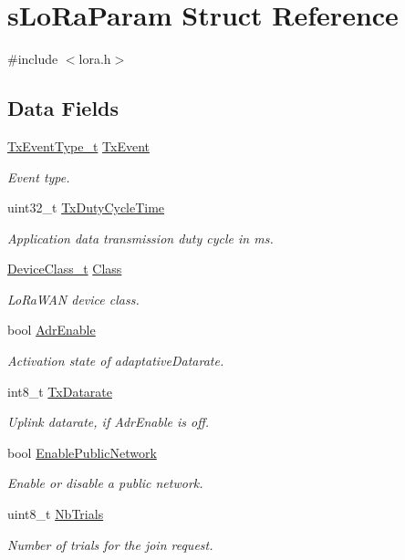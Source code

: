 \hypertarget{structsLoRaParam}{}\section{s\+Lo\+Ra\+Param Struct Reference}
\label{structsLoRaParam}


{\ttfamily \#include $<$lora.\+h$>$}

\subsection*{Data Fields}
\begin{DoxyCompactItemize}
\item 
\hyperlink{lora_8h_ad214b606ffdf2be60abb61bcebbbc83e}{Tx\+Event\+Type\+\_\+t} \hyperlink{structsLoRaParam_ac51a8bbd4a6e35431b1f232f4e2689b1}{Tx\+Event}
\begin{DoxyCompactList}\small\item\em Event type. \end{DoxyCompactList}\item 
uint32\+\_\+t \hyperlink{structsLoRaParam_a0a319805932b2ad94707c26eaa38da23}{Tx\+Duty\+Cycle\+Time}
\begin{DoxyCompactList}\small\item\em Application data transmission duty cycle in ms. \end{DoxyCompactList}\item 
\hyperlink{group__LORAMAC_ga29dc2e097802faaf8fbd0e18ff99695f}{Device\+Class\+\_\+t} \hyperlink{structsLoRaParam_a3c241a0817ffb57f327d8ae3460befbb}{Class}
\begin{DoxyCompactList}\small\item\em Lo\+Ra\+W\+AN device class. \end{DoxyCompactList}\item 
bool \hyperlink{structsLoRaParam_aa6b992022ef325e70e97b10a7356381e}{Adr\+Enable}
\begin{DoxyCompactList}\small\item\em Activation state of adaptative\+Datarate. \end{DoxyCompactList}\item 
int8\+\_\+t \hyperlink{structsLoRaParam_a89ef74152e56be4a7a105a5b1aec4718}{Tx\+Datarate}
\begin{DoxyCompactList}\small\item\em Uplink datarate, if Adr\+Enable is off. \end{DoxyCompactList}\item 
bool \hyperlink{structsLoRaParam_a48c6a425b62951375d564de86927143f}{Enable\+Public\+Network}
\begin{DoxyCompactList}\small\item\em Enable or disable a public network. \end{DoxyCompactList}\item 
uint8\+\_\+t \hyperlink{structsLoRaParam_a8727bc2b47eb808bb4f1ad0fc6f0c257}{Nb\+Trials}
\begin{DoxyCompactList}\small\item\em Number of trials for the join request. \end{DoxyCompactList}\end{DoxyCompactItemize}


